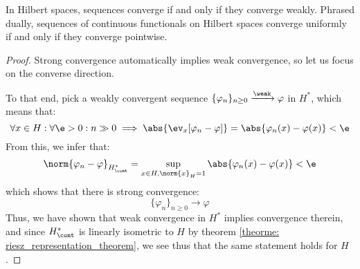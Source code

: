         \begin{corollary} \label{coro: hilbert_space_uniformity}
            In Hilbert spaces, sequences converge if and only if they converge weakly. Phrased dually, sequences of continuous functionals on Hilbert spaces converge uniformly if and only if they converge pointwise.
        \end{corollary}
            \begin{proof}
                Strong convergence automatically implies weak convergence, so let us focus on the converse direction.
            
                To that end, pick a weakly convergent sequence $\{\varphi_n\}_{n \geq 0} \xrightarrow[]{\weak} \varphi$ in $H^*$, which means that:
                    $$\forall x \in H: \forall \e > 0: n \gg 0 \implies \abs{\ev_x[\varphi_n - \varphi]} = \abs{\varphi_n(x) - \varphi(x)} < \e$$
                From this, we infer that:
                    $$\norm{ \varphi_n - \varphi }_{H^*_{\cont}} = \sup_{x \in H, \norm{x}_H = 1} \abs{\varphi_n(x) - \varphi(x)} < \e$$
                which shows that there is strong convergence:
                    $$\{\varphi_n\}_{n \geq 0} \to \varphi$$
                Thus, we have shown that weak convergence in $H^*$ implies convergence therein, and since $H^*_{\cont}$ is linearly isometric to $H$ by theorem \ref{theorme: riesz_representation_theorem}, we see thus that the same statement holds for $H$.
            \end{proof}


